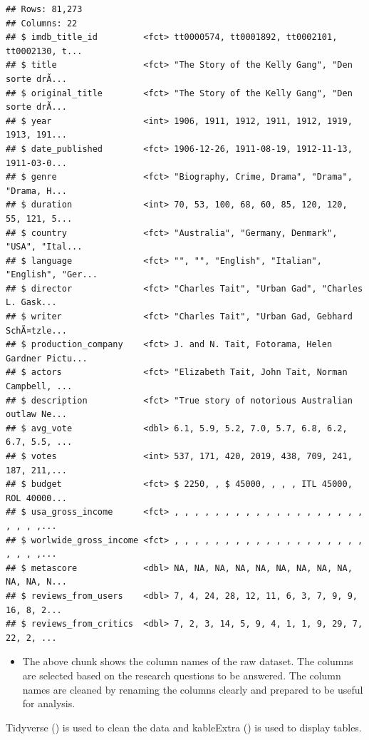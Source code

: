 \documentclass[11pt,a4paper,]{article}
\providecommand{\tightlist}{%
  \setlength{\itemsep}{0pt}\setlength{\parskip}{0pt}}
\begin{document}
\begin{verbatim}
## Rows: 81,273
## Columns: 22
## $ imdb_title_id         <fct> tt0000574, tt0001892, tt0002101, tt0002130, t...
## $ title                 <fct> "The Story of the Kelly Gang", "Den sorte drÃ...
## $ original_title        <fct> "The Story of the Kelly Gang", "Den sorte drÃ...
## $ year                  <int> 1906, 1911, 1912, 1911, 1912, 1919, 1913, 191...
## $ date_published        <fct> 1906-12-26, 1911-08-19, 1912-11-13, 1911-03-0...
## $ genre                 <fct> "Biography, Crime, Drama", "Drama", "Drama, H...
## $ duration              <int> 70, 53, 100, 68, 60, 85, 120, 120, 55, 121, 5...
## $ country               <fct> "Australia", "Germany, Denmark", "USA", "Ital...
## $ language              <fct> "", "", "English", "Italian", "English", "Ger...
## $ director              <fct> "Charles Tait", "Urban Gad", "Charles L. Gask...
## $ writer                <fct> "Charles Tait", "Urban Gad, Gebhard SchÃ¤tzle...
## $ production_company    <fct> J. and N. Tait, Fotorama, Helen Gardner Pictu...
## $ actors                <fct> "Elizabeth Tait, John Tait, Norman Campbell, ...
## $ description           <fct> "True story of notorious Australian outlaw Ne...
## $ avg_vote              <dbl> 6.1, 5.9, 5.2, 7.0, 5.7, 6.8, 6.2, 6.7, 5.5, ...
## $ votes                 <int> 537, 171, 420, 2019, 438, 709, 241, 187, 211,...
## $ budget                <fct> $ 2250, , $ 45000, , , , ITL 45000, ROL 40000...
## $ usa_gross_income      <fct> , , , , , , , , , , , , , , , , , , , , , , ,...
## $ worlwide_gross_income <fct> , , , , , , , , , , , , , , , , , , , , , , ,...
## $ metascore             <dbl> NA, NA, NA, NA, NA, NA, NA, NA, NA, NA, NA, N...
## $ reviews_from_users    <dbl> 7, 4, 24, 28, 12, 11, 6, 3, 7, 9, 9, 16, 8, 2...
## $ reviews_from_critics  <dbl> 7, 2, 3, 14, 5, 9, 4, 1, 1, 9, 29, 7, 22, 2, ...
\end{verbatim}

\begin{itemize}
\tightlist
\item
  The above chunk shows the column names of the raw dataset. The columns are selected based on the research questions to be answered. The column names are cleaned by renaming the columns clearly and prepared to be useful for analysis.
\end{itemize}

Tidyverse (\textcite{tidyverse}) is used to clean the data and kableExtra (\textcite{kableExtra}) is used to display tables.
\end{document}
